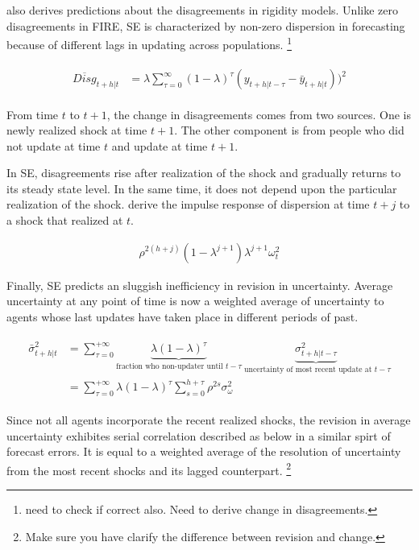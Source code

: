 \documentclass[]{article}
\begin{document}
\citet{coibion2012can} also derives predictions about the disagreements in rigidity models. Unlike zero disagreements in FIRE, SE is characterized by non-zero dispersion in forecasting because of different lags in updating across populations. \footnote{need to check if correct also. Need to derive change in disagreements.} 

\begin{eqnarray}
\begin{aligned}
\overline{Disg}_{t+h|t} & = \lambda \sum^{\infty}_{\tau=0} (1-\lambda)^{\tau} (y_{t+h|t-\tau} - \bar y_{t+h|t }))^2  
\end{aligned}
\end{eqnarray}

From time $t$ to $t+1$, the change in disagreements comes from two sources. One is newly realized shock at time $t+1$. The other component is from people who did not update at time $t$ and update at time $t+1$.  

In SE, disagreements rise after realization of the shock and gradually returns to its steady state level. In the same time, it does not depend upon the particular realization of the shock. \citet{coibion2012can} derive the impulse response of dispersion at time $t+j$ to a shock that realized at $t$. 

\begin{eqnarray}
\rho^{2(h+j)} (1-\lambda^{j+1})\lambda^{j+1} \omega^2_t
\end{eqnarray}

Finally, SE predicts an sluggish inefficiency in revision in uncertainty. Average uncertainty at any point of time is now a weighted average of uncertainty to agents whose last updates have taken place in different periods of past.  

\begin{eqnarray}
\begin{aligned}
\bar \sigma^2_{t+h|t} & = \sum^{+\infty}_{\tau =0} \underbrace{\lambda (1-\lambda)^\tau}_{\text{fraction who non-updater until }t-\tau} \underbrace{\sigma^2_{t+h|t-\tau}}_{\text{ uncertainty of most recent update at }t-\tau} \\
& = \sum^{+\infty}_{\tau =0} \lambda (1-\lambda)^\tau \sum^{h+\tau}_{s=0}\rho^{2s} \sigma^2_{\omega}
\end{aligned}
\end{eqnarray}

Since not all agents incorporate the recent realized shocks, the revision in average uncertainty exhibites serial correlation described as below in a similar spirt of forecast errors. It is equal to a weighted average of the resolution of uncertainty from the most recent shocks and its lagged counterpart. \footnote{Make sure you have clarify the difference between revision and change.}
\end{document}
